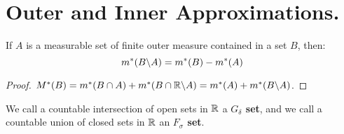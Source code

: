 
\section{Outer and Inner Approximations.}

\begin{lemma}\label{8.3.1}
    If $A$ is a measurable set of finite outer measure contained in a set $B$,
    then:
    \begin{equation*}
        m^*(B \backslash A)=m^*(B)-m^*(A)
    \end{equation*}
\end{lemma}
\begin{proof}
    $M^*(B)=m^*(B \cap A)+m^*(B \cap \mathbb{R} \backslash A)=m^*(A)+m^*(B \backslash A)$.
\end{proof}

\begin{definition}
    We call a countable intersection of open sets in $\mathbb{R}$ a \textbf{$G_\delta$
    set}, and we call a countable union of closed sets in $\mathbb{R}$ an
    \textbf{$F_\sigma$ set}.
\end{definition}

